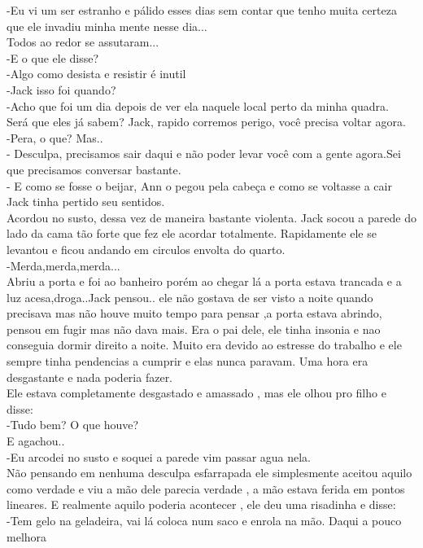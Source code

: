 \documentclass{book}
\begin{document}
 -Eu vi um ser estranho e pálido esses dias sem contar que tenho muita certeza que ele invadiu minha mente nesse dia...\\
 Todos ao redor se assutaram...\\
 -E o que ele disse?\\
 -Algo como desista e resistir é inutil\\
 -Jack isso foi quando?\\
 -Acho que foi um dia depois de ver ela naquele local perto da minha quadra.\\
 Será que eles já sabem? Jack, rapido corremos perigo, você precisa voltar agora. \\
 -Pera, o que? Mas..\\
 - Desculpa, precisamos sair daqui e não poder levar você com a gente agora.Sei que precisamos conversar bastante.\\
 - E como se fosse o beijar, Ann o pegou pela cabeça e como se voltasse a cair Jack tinha pertido seu sentidos.\\
 Acordou no susto, dessa vez de maneira bastante violenta. Jack socou a parede do lado da cama tão forte que fez ele acordar totalmente. Rapidamente ele se levantou e ficou andando em circulos envolta do quarto.\\
 -Merda,merda,merda... \\
 Abriu a porta e foi ao banheiro porém ao chegar lá a porta estava trancada e a luz acesa,droga..Jack pensou.. ele não gostava de ser visto a noite quando precisava mas não houve muito tempo para pensar ,a porta estava abrindo, pensou em fugir mas não dava mais. Era o pai dele, ele tinha insonia e nao conseguia dormir direito a noite. Muito era devido ao estresse do trabalho e ele sempre tinha pendencias a cumprir e elas nunca paravam. Uma hora era desgastante e nada poderia fazer.\\
 Ele estava completamente desgastado e amassado , mas ele olhou pro filho e disse:\\
 -Tudo bem? O que houve?\\
 E agachou..\\
 -Eu arcodei no susto e soquei a parede vim passar agua nela.\\
 Não pensando em nenhuma desculpa esfarrapada ele simplesmente aceitou aquilo como verdade e viu a mão dele parecia verdade , a mão estava ferida em pontos lineares. E realmente aquilo poderia acontecer , ele deu uma risadinha e disse:\\
 -Tem gelo na geladeira, vai lá coloca num saco e enrola na mão. Daqui a pouco melhora\\
\end{document}
